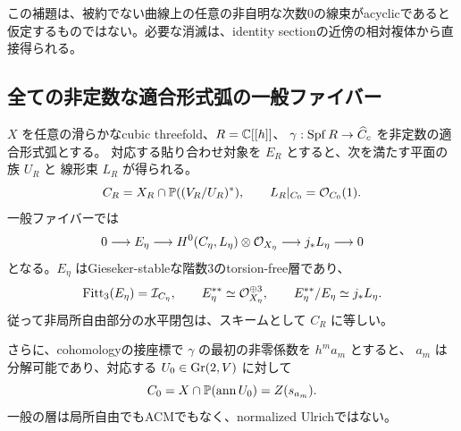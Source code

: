 この補題は、被約でない曲線上の任意の非自明な次数0の線束がacyclicであると
仮定するものではない。必要な消滅は、identity sectionの近傍の相対複体から直接得られる。

\subsection{全ての非定数な適合形式弧の一般ファイバー}

\begin{theorem}\label{thm:all-compatible-arcs}
$X$ を任意の滑らかなcubic threefold、$R=\mathbb C[[h]]$、
$\gamma:\operatorname{Spf} R\to\widehat C_c$ を非定数の適合形式弧とする。
対応する貼り合わせ対象を $E_R$ とすると、次を満たす平面の族 $U_R$ と
線形束 $L_R$ が得られる。
\[
 C_R=X_R\cap\mathbb P((V_R/U_R)^*),\qquad
 L_R|_{C_0}=\mathcal O_{C_0}(1).
\]
一般ファイバーでは
\begin{equation}\label{eq:all-arcs-evaluation}
 0\longrightarrow E_\eta
 \longrightarrow H^0(C_\eta,L_\eta)\otimes\mathcal O_{X_\eta}
 \longrightarrow j_*L_\eta\longrightarrow0
\end{equation}
となる。$E_\eta$ はGieseker-stableな階数3のtorsion-free層であり、
\[
 \operatorname{Fitt}_3(E_\eta)=\mathcal I_{C_\eta},\qquad
 E_\eta^{**}\simeq\mathcal O_{X_\eta}^{\oplus3},\qquad
 E_\eta^{**}/E_\eta\simeq j_*L_\eta.
\]
従って非局所自由部分の水平閉包は、スキームとして $C_R$ に等しい。

さらに、cohomologyの接座標で $\gamma$ の最初の非零係数を $h^m a_m$ とすると、
$a_m$ は分解可能であり、対応する $U_0\in\operatorname{Gr}(2,V)$ に対して
\[
 C_0=X\cap\mathbb P(\operatorname{ann}U_0)=Z(s_{a_m}).
\]
一般の層は局所自由でもACMでもなく、normalized Ulrichではない。
\end{theorem}

